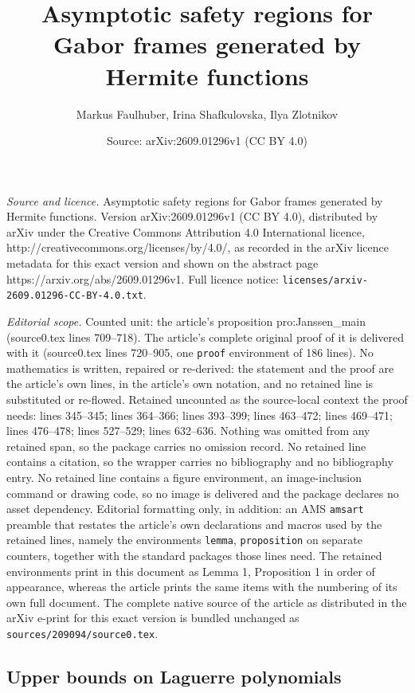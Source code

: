 \documentclass[10pt,a4paper]{amsart}
\title{Asymptotic safety regions for Gabor frames generated by Hermite functions}
\author{Markus Faulhuber, Irina Shafkulovska, Ilya Zlotnikov}
\date{Source: arXiv:2609.01296v1 (CC BY 4.0)}
\begin{document}
\maketitle

\noindent\emph{Source and licence.} Asymptotic safety regions for Gabor frames generated by Hermite functions. Version arXiv:2609.01296v1 (CC BY 4.0), distributed by arXiv under the Creative Commons Attribution 4.0 International licence, http://creativecommons.org/licenses/by/4.0/, as recorded in the arXiv licence metadata for this exact version and shown on the abstract page https://arxiv.org/abs/2609.01296v1. Full licence notice: \texttt{licenses/arxiv-2609.01296-CC-BY-4.0.txt}.\par\smallskip

\noindent\textit{Editorial scope.} Counted unit: the article's proposition pro:Janssen\_main (source0.tex lines 709--718). The article's complete original proof of it is delivered with it (source0.tex lines 720--905, one \texttt{proof} environment of 186 lines). No mathematics is written, repaired or re-derived: the statement and the proof are the article's own lines, in the article's own notation, and no retained line is substituted or re-flowed.  Retained uncounted as the source-local context the proof needs: lines 345--345; lines 364--366; lines 393--399; lines 463--472; lines 469--471; lines 476--478; lines 527--529; lines 632--636.  Nothing was omitted from any retained span, so the package carries no omission record.  No retained line contains a citation, so the wrapper carries no bibliography and no bibliography entry.  No retained line contains a figure environment, an image-inclusion command or drawing code, so no image is delivered and the package declares no asset dependency.  Editorial formatting only, in addition: an AMS \texttt{amsart} preamble that restates the article's own declarations and macros used by the retained lines, namely the environments \texttt{lemma}, \texttt{proposition} on separate counters, together with the standard packages those lines need.  The retained environments print in this document as Lemma 1, Proposition 1 in order of appearance, whereas the article prints the same items with the numbering of its own full document.  The complete native source of the article as distributed in the arXiv e-print for this exact version is bundled unchanged as \texttt{sources/209094/source0.tex}.
\subsection{Upper bounds on Laguerre polynomials}\label{sec:upper_bounds_for_laguerre}
\end{document}
